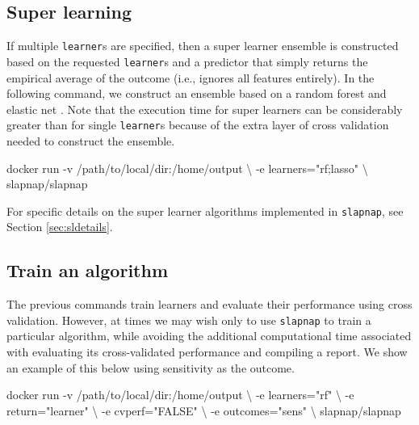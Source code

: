 \documentclass[]{article}
\newenvironment{Shaded}{\begin{snugshade}}{\end{snugshade}}
\newcommand{\StringTok}[1]{\textcolor[rgb]{0.31,0.60,0.02}{#1}}
\newcommand{\ExtensionTok}[1]{#1}
\newcommand{\NormalTok}[1]{#1}
\begin{document}
\subsection{Super learning}\label{super-learning}

If multiple \texttt{learner}s are specified, then a super learner
ensemble \citep{vanderlaan2007} is constructed based on the requested
\texttt{learner}s and a predictor that simply returns the empirical
average of the outcome (i.e., ignores all features entirely). In the
following command, we construct an ensemble based on a random forest
\citep{breiman2001} and elastic net \citep{zou2005}. Note that the
execution time for super learners can be considerably greater than for
single \texttt{learner}s because of the extra layer of cross validation
needed to construct the ensemble.

\begin{Shaded}
\begin{Highlighting}[]
\ExtensionTok{docker}\NormalTok{ run -v /path/to/local/dir:/home/output \textbackslash{}}
\NormalTok{           -e learners=}\StringTok{"rf;lasso"}\NormalTok{ \textbackslash{}}
\NormalTok{           slapnap/slapnap}
\end{Highlighting}
\end{Shaded}

For specific details on the super learner algorithms implemented in
\texttt{slapnap}, see Section \ref{sec:sldetails}.

\subsection{Train an algorithm}\label{train-an-algorithm}

The previous commands train learners and evaluate their performance
using cross validation. However, at times we may wish only to use
\texttt{slapnap} to train a particular algorithm, while avoiding the
additional computational time associated with evaluating its
cross-validated performance and compiling a report. We show an example
of this below using sensitivity as the outcome.

\begin{Shaded}
\begin{Highlighting}[]
\ExtensionTok{docker}\NormalTok{ run -v /path/to/local/dir:/home/output \textbackslash{}}
\NormalTok{           -e learners=}\StringTok{"rf"}\NormalTok{ \textbackslash{}}
\NormalTok{           -e return=}\StringTok{"learner"}\NormalTok{ \textbackslash{}}
\NormalTok{           -e cvperf=}\StringTok{"FALSE"}\NormalTok{ \textbackslash{}}
\NormalTok{           -e outcomes=}\StringTok{"sens"}\NormalTok{ \textbackslash{}}
\NormalTok{           slapnap/slapnap}
\end{Highlighting}
\end{Shaded}
\end{document}
